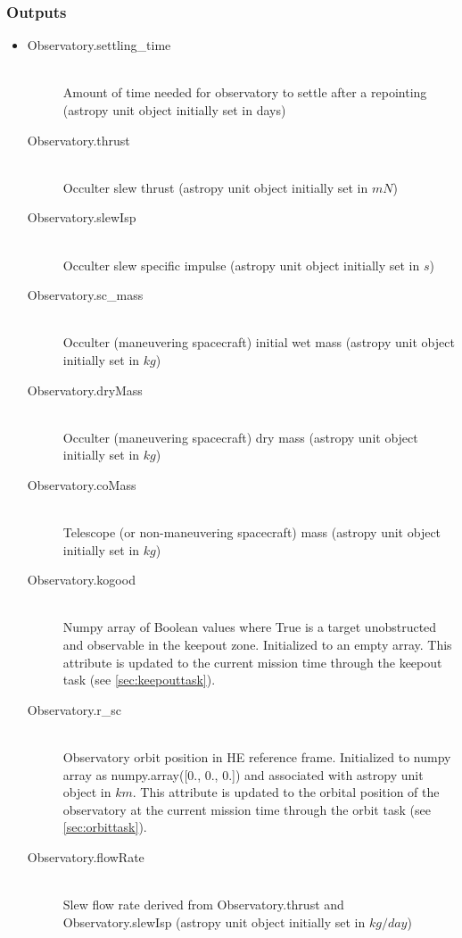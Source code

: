 \documentclass[cleanfoot]{asme2ej}
\begin{document}
\subsubsection*{Outputs}
\begin{itemize}
    \item
    \begin{description}
        \item[Observatory.settling\_time] \hfill \\
        Amount of time needed for observatory to settle after a repointing (astropy unit object initially set in days)
        \item[Observatory.thrust] \hfill \\
        Occulter slew thrust (astropy unit object initially set in $ mN $)
        \item[Observatory.slewIsp] \hfill \\
        Occulter slew specific impulse (astropy unit object initially set in $ s $)
        \item[Observatory.sc\_mass] \hfill \\
        Occulter (maneuvering spacecraft) initial wet mass (astropy unit object initially set in $ kg $)
        \item[Observatory.dryMass] \hfill \\
        Occulter (maneuvering spacecraft) dry mass (astropy unit object initially set in $ kg $)
        \item[Observatory.coMass] \hfill \\
        Telescope (or non-maneuvering spacecraft) mass (astropy unit object initially set in $ kg $)
        \item[Observatory.kogood] \hfill \\
        Numpy array of Boolean values where True is a target unobstructed and observable in the keepout zone. Initialized to an empty array. This attribute is updated to the current mission time through the keepout task (see \ref{sec:keepouttask}).
        \item[Observatory.r\_sc] \hfill \\
        Observatory orbit position in HE reference frame. Initialized to numpy array as numpy.array([0., 0., 0.]) and associated with astropy unit object in $ km $. This attribute is updated to the orbital position of the observatory at the current mission time through the orbit task (see \ref{sec:orbittask}).
        \item[Observatory.flowRate] \hfill \\
        Slew flow rate derived from Observatory.thrust and Observatory.slewIsp (astropy unit object initially set in $ kg/day $)
        
    \end{description}
\end{itemize}
\end{document}
